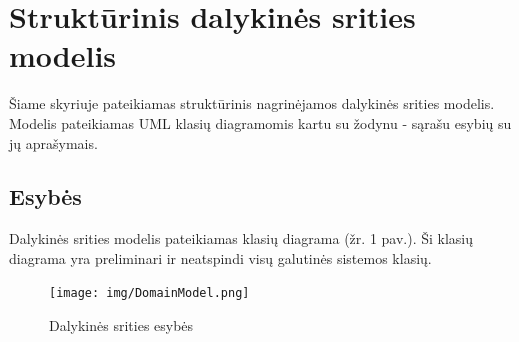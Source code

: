 \documentclass{VUMIFPSkursinis}
\begin{document}
\section{Struktūrinis dalykinės srities modelis}
	Šiame skyriuje pateikiamas struktūrinis nagrinėjamos dalykinės srities modelis. 
	Modelis pateikiamas UML klasių diagramomis kartu su žodynu - sąrašu esybių su jų aprašymais. 
	\subsection{Esybės}
		Dalykinės srities modelis pateikiamas klasių diagrama (žr. 1 pav.). Ši klasių diagrama yra
		preliminari ir neatspindi visų galutinės sistemos klasių.
		\begin{figure}[H]
			\centering
			\texttt{[image: img/DomainModel.png]}
			\caption{Dalykinės srities esybės}
			\label{img:psi2-domain-model}
		\end{figure}
\end{document}
